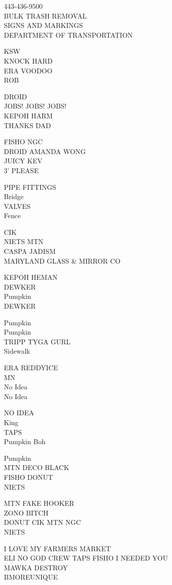 \documentclass[10pt,letterpaper]{article}
\begin{document}
443{-}436{-}9500\\
BULK TRASH REMOVAL\\
SIGNS AND MARKINGS\\
DEPARTMENT OF TRANSPORTATION

KSW\\
KNOCK HARD\\
ERA VOODOO\\
ROB

DROID\\
JOBS! JOBS! JOBS!\\
KEPOH HARM\\
THANKS DAD

FISHO NGC\\
DROID AMANDA WONG\\
JUICY KEV\\
3' PLEASE

PIPE FITTINGS\\
Bridge\\
VALVES\\
Fence

CIK\\
NIETS MTN\\
CASPA JADISM\\
MARYLAND GLASS \& MIRROR CO

KEPOH HEMAN\\
DEWKER\\
Pumpkin\\
DEWKER

Pumpkin\\
Pumpkin\\
TRIPP TYGA GURL\\
Sidewalk

ERA REDDYICE\\
MN\\
No Idea\\
No Idea

NO IDEA\\
King\\
TAPS\\
Pumpkin Boh

Pumpkin\\
MTN DECO BLACK\\
FISHO DONUT\\
NIETS

MTN FAKE HOOKER\\
ZONO BITCH\\
DONUT CIK MTN NGC\\
NIETS

I LOVE MY FARMERS MARKET\\
ELI NO GOD CREW TAPS FISHO I NEEDED YOU\\
MAWKA DESTROY\\
BMOREUNIQUE
\end{document}
